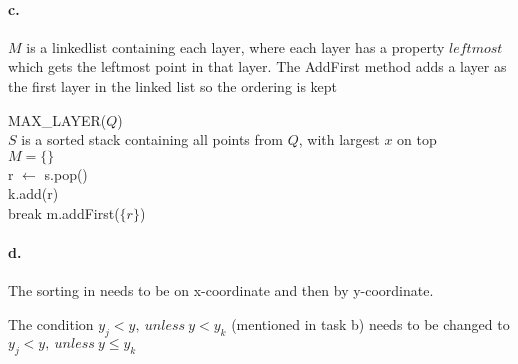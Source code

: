 \paragraph{c.}
$M$ is a linkedlist containing each layer, where each layer has a property $leftmost$ which gets the leftmost point in that layer.
The AddFirst method adds a layer as the first layer in the linked list so the ordering is kept


\begin{algorithm}[H]
MAX\_LAYER($Q$) \\
$S$ is a sorted stack containing all points from $Q$, with largest $x$ on top \\
$M = \{ \}$ \\
{
	r $\leftarrow$ s.pop() \\
	{
		{
			k.add(r) \\
			break
		}
	}
	m.addFirst($\{r\}$)
}
\end{algorithm}

\paragraph{d.}

The sorting in needs to be on x-coordinate and then by y-coordinate.

The condition $ y_j < y, \ unless \ y < y_k $ (mentioned in task b) needs to be changed to $ y_j < y, \ unless \ y \leq y_k $

